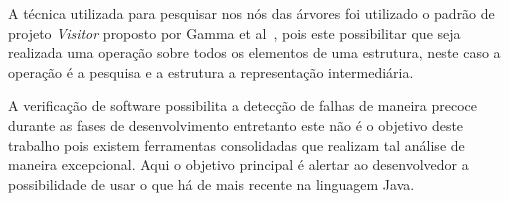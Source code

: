 
A t\'{e}cnica utilizada para pesquisar nos n\'{o}s das \'{a}rvores foi utilizado o padr\~{a}o de projeto \textit{Visitor} proposto por  Gamma et al~\cite{Gamma:1995}, pois este possibilitar que seja realizada uma opera\c{c}\~{a}o sobre todos os elementos de uma estrutura,  neste caso a opera\c{c}\~{a}o  \'{e} a pesquisa e a estrutura a representa\c{c}\~{a}o intermedi\'{a}ria.


A verifica\c{c}\~{a}o de software possibilita a detec\c{c}\~{a}o de falhas de maneira precoce durante as fases de desenvolvimento entretanto este n\~{a}o \'{e} o objetivo deste trabalho pois existem ferramentas consolidadas que realizam tal an\'{a}lise de maneira excepcional. Aqui o objetivo principal \'{e} alertar ao desenvolvedor a possibilidade de usar o que h\'{a} de mais recente na linguagem Java.






